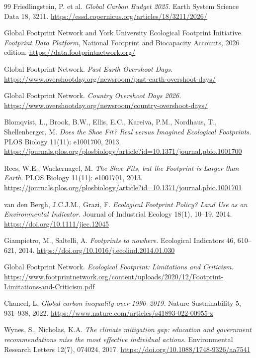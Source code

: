 \documentclass[11pt,a4paper]{article}
\begin{document}
\begin{thebibliography}{99}
 Friedlingstein, P. et al. \emph{Global Carbon Budget 2025.} Earth System Science Data 18, 3211. \url{https://essd.copernicus.org/articles/18/3211/2026/}

 Global Footprint Network and York University Ecological Footprint Initiative. \emph{Footprint Data Platform}, National Footprint and Biocapacity Accounts, 2026 edition. \url{https://data.footprintnetwork.org/}

 Global Footprint Network. \emph{Past Earth Overshoot Days.} \url{https://www.overshootday.org/newsroom/past-earth-overshoot-days/}

 Global Footprint Network. \emph{Country Overshoot Days 2026.} \url{https://www.overshootday.org/newsroom/country-overshoot-days/}

 Blomqvist, L., Brook, B.W., Ellis, E.C., Kareiva, P.M., Nordhaus, T., Shellenberger, M. \emph{Does the Shoe Fit? Real versus Imagined Ecological Footprints.} PLOS Biology 11(11): e1001700, 2013. \url{https://journals.plos.org/plosbiology/article?id=10.1371/journal.pbio.1001700}

 Rees, W.E., Wackernagel, M. \emph{The Shoe Fits, but the Footprint is Larger than Earth.} PLOS Biology 11(11): e1001701, 2013. \url{https://journals.plos.org/plosbiology/article?id=10.1371/journal.pbio.1001701}

 van den Bergh, J.C.J.M., Grazi, F. \emph{Ecological Footprint Policy? Land Use as an Environmental Indicator.} Journal of Industrial Ecology 18(1), 10--19, 2014. \url{https://doi.org/10.1111/jiec.12045}

 Giampietro, M., Saltelli, A. \emph{Footprints to nowhere.} Ecological Indicators 46, 610--621, 2014. \url{https://doi.org/10.1016/j.ecolind.2014.01.030}

 Global Footprint Network. \emph{Ecological Footprint: Limitations and Criticism.} \url{https://www.footprintnetwork.org/content/uploads/2020/12/Footprint-Limitations-and-Criticism.pdf}

 Chancel, L. \emph{Global carbon inequality over 1990--2019.} Nature Sustainability 5, 931--938, 2022. \url{https://www.nature.com/articles/s41893-022-00955-z}

 Wynes, S., Nicholas, K.A. \emph{The climate mitigation gap: education and government recommendations miss the most effective individual actions.} Environmental Research Letters 12(7), 074024, 2017. \url{https://doi.org/10.1088/1748-9326/aa7541}


\end{thebibliography}
\end{document}
